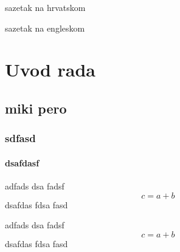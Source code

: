 \documentclass[zavrsni, plain]{FSBtex}
\begin{document}
\titlepage



\begin{AbstractHR}
sazetak na hrvatskom
\end{AbstractHR}

\begin{AbstractEN}
sazetak na engleskom
\end{AbstractEN}

\PageNumberingArabic
\newpage
\chapter{Uvod rada}
\lipsum[1]
\section{miki pero}
\lipsum[1]
\subsection{sdfasd}
\subsubsection{dsafdasf}
\lipsum[1]
\begin{theorem}[Proba]
adfads dsa fadsf
\begin{equation}
c = a + b
\end{equation}
dsafdas fdsa fasd
\end{theorem}
\lipsum[1]

\begin{definition}[Proba]
adfads dsa fadsf
\begin{equation}
c = a + b
\end{equation}
dsafdas fdsa fasd
\end{definition}
\end{document}
